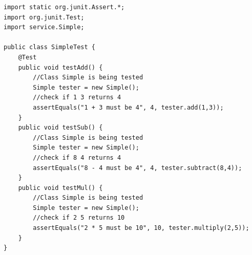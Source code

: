 \documentclass[12pt]{article}
\begin{document}
\newpage
{}

\begin{lstlisting}
import static org.junit.Assert.*;
import org.junit.Test;
import service.Simple;

public class SimpleTest {
	@Test
	public void testAdd() {
		//Class Simple is being tested
		Simple tester = new Simple();
		//check if 1 3 returns 4
		assertEquals("1 + 3 must be 4", 4, tester.add(1,3));
	}
	public void testSub() {
		//Class Simple is being tested
		Simple tester = new Simple();
		//check if 8 4 returns 4
		assertEquals("8 - 4 must be 4", 4, tester.subtract(8,4));
	}
	public void testMul() {
		//Class Simple is being tested
		Simple tester = new Simple();
		//check if 2 5 returns 10
		assertEquals("2 * 5 must be 10", 10, tester.multiply(2,5));
	}
}
\end{lstlisting}

\newpage
\end{document}
